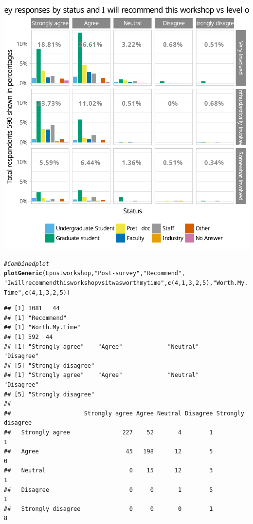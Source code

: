 \documentclass{article}\usepackage[]{graphicx}\usepackage[]{color}
\makeatletter
\newcommand{\hlnum}[1]{\textcolor[rgb]{0.686,0.059,0.569}{#1}}%
\newcommand{\hlstr}[1]{\textcolor[rgb]{0.192,0.494,0.8}{#1}}%
\newcommand{\hlcom}[1]{\textcolor[rgb]{0.678,0.584,0.686}{\textit{#1}}}%
\newcommand{\hlstd}[1]{\textcolor[rgb]{0.345,0.345,0.345}{#1}}%
\newcommand{\hlkwd}[1]{\textcolor[rgb]{0.737,0.353,0.396}{\textbf{#1}}}%
\newenvironment{kframe}{%
 \def\at@end@of@kframe{}%
 \ifinner\ifhmode%
  \def\at@end@of@kframe{\end{minipage}}%
  \begin{minipage}{\columnwidth}%
 \fi\fi%
 \def\FrameCommand##1{\hskip\@totalleftmargin \hskip-\fboxsep
 \colorbox{shadecolor}{##1}\hskip-\fboxsep
     \hskip-\linewidth \hskip-\@totalleftmargin \hskip\columnwidth}%
 \MakeFramed {\advance\hsize-\width
   \@totalleftmargin\z@ \linewidth\hsize
   \@setminipage}}%
 {\par\unskip\endMakeFramed%
 \at@end@of@kframe}
\newenvironment{knitrout}{}{} %
\makeatother
\begin{document}
\begin{knitrout}
{\centering \includegraphics[width=.6\linewidth]{figure/calls-Rnwplotting-postsurvey-data-25} 

}


\begin{kframe}\begin{alltt}
\hlcom{# Combined plot}
\hlkwd{plotGeneric}\hlstd{(Epostworkshop,} \hlstr{"Post-survey"}\hlstd{,} \hlstr{"Recommend"} \hlstd{,}
            \hlstr{"I will recommend this workshop vs it was worth my time"}\hlstd{,}  \hlkwd{c}\hlstd{(}\hlnum{4}\hlstd{,}\hlnum{1}\hlstd{,}\hlnum{3}\hlstd{,}\hlnum{2}\hlstd{,}\hlnum{5}\hlstd{),}\hlstr{"Worth.My.Time"}\hlstd{,} \hlkwd{c}\hlstd{(}\hlnum{4}\hlstd{,}\hlnum{1}\hlstd{,}\hlnum{3}\hlstd{,}\hlnum{2}\hlstd{,}\hlnum{5}\hlstd{))}
\end{alltt}
\begin{verbatim}
## [1] 1081   44
## [1] "Recommend"
## [1] "Worth.My.Time"
## [1] 592  44
## [1] "Strongly agree"    "Agree"             "Neutral"           "Disagree"         
## [5] "Strongly disagree"
## [1] "Strongly agree"    "Agree"             "Neutral"           "Disagree"         
## [5] "Strongly disagree"
##                    
##                     Strongly agree Agree Neutral Disagree Strongly disagree
##   Strongly agree               227    52       4        1                 1
##   Agree                         45   198      12        5                 0
##   Neutral                        0    15      12        3                 1
##   Disagree                       0     0       1        5                 1
##   Strongly disagree              0     0       0        1                 8
\end{verbatim}
\end{kframe}


\end{knitrout}
\end{document}
